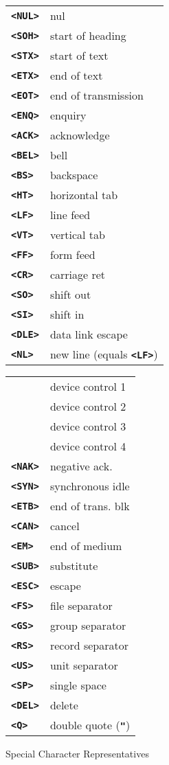 \documentclass[12pt]{article}
\makeatletter
\newcommand{\TT}[1]{{\tt \bfseries #1}}
\newcommand{\tttkey}[1]{\TT{<#1>}\index{#1@{\tt <#1>}}}
\newlength{\figurewidth}
\newenvironment{boxedfigure}[1][!btp]%
	{\begin{figure*}[#1]
	 \begin{lrbox}{\figurebox}
	 \begin{minipage}{\figurewidth}

	 \vspace*{1ex}}%
	{
	 \vspace*{1ex}

	 \end{minipage}
	 \end{lrbox}
	 \begin{center}
	 \fbox{\hspace*{0.1in}\usebox{\figurebox}\hspace*{0.1in}}
	 \end{center}
	 \end{figure*}}
\makeatother
\begin{document}
\begin{boxedfigure}[!t]

\begin{center}
\begin{tabular}{lp{2in}}
\tttkey{NUL} & nul \\
\tttkey{SOH} & start of heading \\
\tttkey{STX} & start of text \\
\tttkey{ETX} & end of text \\
\tttkey{EOT} & end of transmission \\
\tttkey{ENQ} & enquiry \\
\tttkey{ACK} & acknowledge \\
\tttkey{BEL} & bell \\
\tttkey{BS}  & backspace \\
\tttkey{HT}  & horizontal tab \\
\tttkey{LF}  & line feed \\
\tttkey{VT}  & vertical tab \\
\tttkey{FF}  & form feed \\
\tttkey{CR}  & carriage ret \\
\tttkey{SO}  & shift out \\
\tttkey{SI}  & shift in \\
\tttkey{DLE} & data link escape
\\[1ex]
\tttkey{NL}  & new line (equals \TT{<LF>}) \\
\end{tabular}
\begin{tabular}{lp{2in}}
\tttkey{DC1} & device control 1 \\
\tttkey{DC2} & device control 2 \\
\tttkey{DC3} & device control 3 \\
\tttkey{DC4} & device control 4 \\
\tttkey{NAK} & negative ack. \\
\tttkey{SYN} & synchronous idle \\
\tttkey{ETB} & end of trans. blk \\
\tttkey{CAN} & cancel \\
\tttkey{EM}  & end of medium \\
\tttkey{SUB} & substitute \\
\tttkey{ESC} & escape \\
\tttkey{FS}  & file separator \\
\tttkey{GS}  & group separator \\
\tttkey{RS}  & record separator \\
\tttkey{US}  & unit separator \\
\tttkey{SP}  & single space \\
\tttkey{DEL} & delete
\\[1ex]
\tttkey{Q}  & double quote (\TT{"}) \\
\end{tabular}
\end{center}

\caption{Special Character Representatives}
\label{SPECIAL-CHARACTER-REPRESENTATIVES}
\end{boxedfigure}
\end{document}
